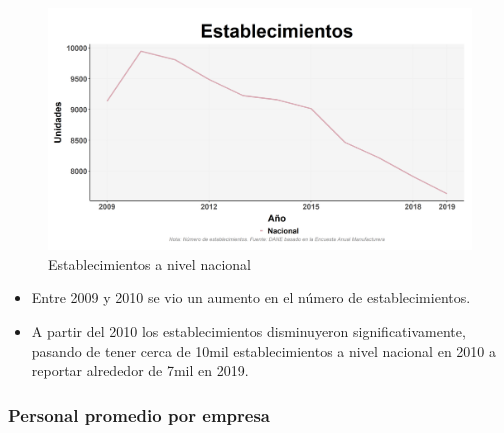     \begin{figure}[H]
        \caption{Establecimientos a nivel nacional \label{map_result_2} }
        \begin{center}
        \includegraphics[width=\textwidth,keepaspectratio]{img/var_218_trend.png}
        \end{center}
    \end{figure}
            \begin{itemize}
                    \item Entre 2009 y 2010 se vio un aumento en el número de establecimientos.
                    \item A partir del 2010 los establecimientos disminuyeron significativamente, pasando de tener cerca de 10mil establecimientos a nivel nacional en 2010 a reportar alrededor de 7mil en 2019.
                    \end{itemize}

        \subsubsection{Personal promedio por empresa}

